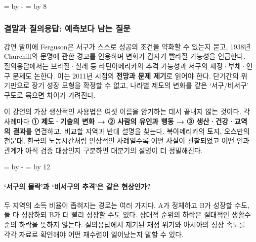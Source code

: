 \documentclass[10pt,a4paper]{article}
\newcommand{\ReserveQuestionSpace}{%
  \par\begingroup
  \dimen0=\pagegoal \advance\dimen0 by -\pagetotal
  \dimen2=\baselineskip \multiply\dimen2 by 12
  \ifdim\dimen0<\dimen2 \newpage\fi
  \endgroup}
\newcommand{\ReserveReadingSectionSpace}{%
  \par\begingroup
  \dimen0=\pagegoal \advance\dimen0 by -\pagetotal
  \dimen2=\baselineskip \multiply\dimen2 by 8
  \ifdim\dimen0<\dimen2 \newpage\fi
  \endgroup}
\begin{document}
\ReserveReadingSectionSpace
\subsubsection*{결말과 질의응답: 예측보다 남는 질문}

강연 말미에 Ferguson은 서구가 스스로 성공의 조건을 약화할 수 있는지 묻고, 1938년 Churchill의 문명에 관한 경고를 인용하며 변화가 갑자기 빨라질 가능성을 언급한다. 질의응답에서는 브라질·칠레 등 라틴아메리카의 추격 가능성과 서구의 재정·부채·인구 문제도 논한다. 이는 2011년 시점의 \textbf{전망과 문제 제기}로 읽어야 한다. 단기간의 위기만으로 장기 성장 모형을 확정할 수 없고, 나라별 제도의 변화를 같은 ‘서구/비서구’ 구도로 묶으면 차이가 가려진다.\par

이 강연의 가장 생산적인 사용법은 여섯 이름을 암기하는 데서 끝내지 않는 것이다. 각 사례마다 \textbf{① 제도·기술의 변화 → ② 사람의 유인과 행동 → ③ 생산·건강·교역의 결과}를 연결하고, 비교할 지역과 반대 설명을 찾는다. 북아메리카의 토지, 오스만의 천문대, 한국의 노동시간처럼 인상적인 사례일수록 어떤 사실이 관찰되었고 어떤 인과관계가 아직 검증 대상인지 구분하면 대분기의 설명이 더 정밀해진다.\par

\ReserveQuestionSpace
\paragraph{‘서구의 몰락’과 ‘비서구의 추격’은 같은 현상인가?}
두 지역의 소득 비율이 좁혀지는 경로는 여러 가지다. A가 정체하고 B가 성장할 수도, 둘 다 성장하되 B가 더 빨리 성장할 수도 있다. 상대적 순위의 하락은 절대적인 생활수준의 하락을 뜻하지 않는다. 질의응답에서 제기된 재정 위기와 아시아의 성장 속도를 각각 자료로 확인해야 어떤 재수렴이 일어났는지 말할 수 있다.\par
\end{document}
